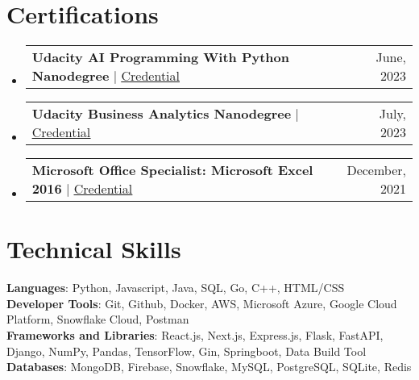 \documentclass[letterpaper,11pt]{article}
\makeatletter
\newcommand{\certification}[2]{
    \item
    \begin{tabular*}{0.97\textwidth}{l@{\extracolsep{\fill}}r}
      \small#1 & #2 \\
    \end{tabular*}\vspace{-7pt}
}
\newcommand{\resumeSubHeadingListStart}{\begin{itemize}[leftmargin=0.15in, label={}]}
\newcommand{\resumeSubHeadingListEnd}{\end{itemize}}
\makeatother
\begin{document}
\section{Certifications}
    \resumeSubHeadingListStart
        \certification
            {\textbf{Udacity AI Programming With Python Nanodegree} $|$ 
            \href{https://graduation.udacity.com/confirm/e/15515804-0ae8-11ee-8b65-efc11f4b572b}{\underline{Credential}}}
            {June, 2023}
            
        \certification
            {\textbf{Udacity Business Analytics Nanodegree} $|$ 
            \href{https://graduation.udacity.com/confirm/e/de4ec428-ff33-11ed-b2f0-438626a097f9}{\underline{Credential}}}
            {July, 2023}

        \certification
            {\textbf{Microsoft Office Specialist: Microsoft Excel 2016} $|$ \href{https://www.certiport.com/Portal/Pages/PrintTranscriptInfo.aspx?action=Cert\&id=251\&cvid=S9IrElVyeBpsV0mUlKTBrA==}{\underline{Credential}}}
            {December, 2021}
    \resumeSubHeadingListEnd


\section{Technical Skills}
    \begin{itemize}[leftmargin=0.15in, label={}]
        \small{\item{
            \textbf{Languages}{: Python, Javascript, Java, SQL, Go, C++, HTML/CSS} \\
            
            \textbf{Developer Tools}{: Git, Github, Docker, AWS, Microsoft Azure, Google Cloud Platform, Snowflake Cloud, Postman} \\
            
            \textbf{Frameworks and Libraries}{: React.js, Next.js, Express.js, Flask, FastAPI, Django, NumPy, Pandas, TensorFlow, Gin, Springboot, Data Build Tool} \\
            
            \textbf{Databases}{: MongoDB, Firebase, Snowflake, MySQL, PostgreSQL, SQLite, Redis} \\
        }}
    \end{itemize}
\end{document}
